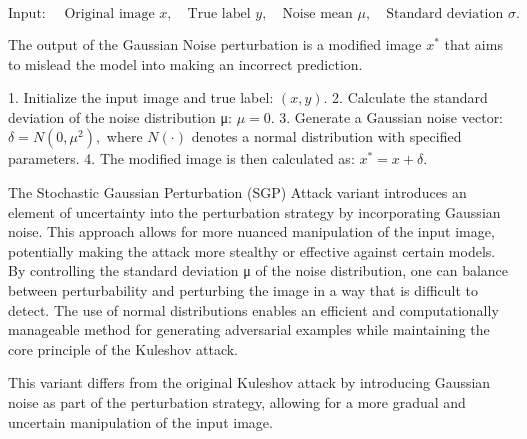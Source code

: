 \[
\text{Input: } \quad \text{Original image } x, \quad \text{True label } y, \quad \text{Noise mean } \mu, \quad \text{Standard deviation } \sigma.
\]

The output of the Gaussian Noise perturbation is a modified image \( x^* \) that aims to mislead the model into making an incorrect prediction.

1. Initialize the input image and true label:
   $
   (x, y).
   $
2. Calculate the standard deviation of the noise distribution μ:
   $
   \mu = 0.
   $
3. Generate a Gaussian noise vector:
   $
   \delta = N(0, \mu^2),
   $
   where $N(\cdot)$ denotes a normal distribution with specified parameters.
4. The modified image is then calculated as:
   $
   x^* = x + \delta.
   $

The Stochastic Gaussian Perturbation (SGP) Attack variant introduces an element of uncertainty into the perturbation strategy by incorporating Gaussian noise. This approach allows for more nuanced manipulation of the input image, potentially making the attack more stealthy or effective against certain models. By controlling the standard deviation μ of the noise distribution, one can balance between perturbability and perturbing the image in a way that is difficult to detect. The use of normal distributions enables an efficient and computationally manageable method for generating adversarial examples while maintaining the core principle of the Kuleshov attack.

This variant differs from the original Kuleshov attack by introducing Gaussian noise as part of the perturbation strategy, allowing for a more gradual and uncertain manipulation of the input image.